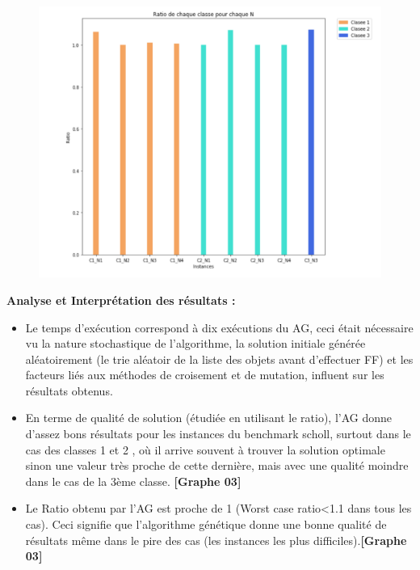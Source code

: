 \documentclass{article}
\begin{document}
\begin{figure}[H]
  \includegraphics[width=\linewidth]{../figures/pic11.PNG}
\end{figure}
\textbf{Analyse et Interprétation des résultats : }
\newline
\begin{itemize}
	\item Le temps d’exécution correspond à dix exécutions du AG, ceci était nécessaire vu la nature stochastique de l’algorithme,  la solution initiale générée aléatoirement (le trie aléatoir de la liste des objets avant d’effectuer FF) et les facteurs liés aux méthodes de croisement et de mutation, influent sur les résultats obtenus.
	\item En terme de qualité de solution (étudiée en utilisant le ratio), l'AG donne d’assez bons résultats pour les instances du benchmark scholl, surtout dans le cas des classes 1 et 2 , où il arrive souvent à trouver la solution optimale sinon une valeur très proche de cette dernière, mais avec une qualité moindre dans le cas de la 3ème classe. \textbf{[Graphe 03] }
	\item Le Ratio obtenu par l’AG est proche de 1 (Worst case ratio<1.1 dans tous les cas). Ceci signifie que l’algorithme génétique donne une bonne qualité de résultats même dans le pire des cas (les instances les plus difficiles).\textbf{[Graphe 03] }
\end{itemize}
\end{document}
